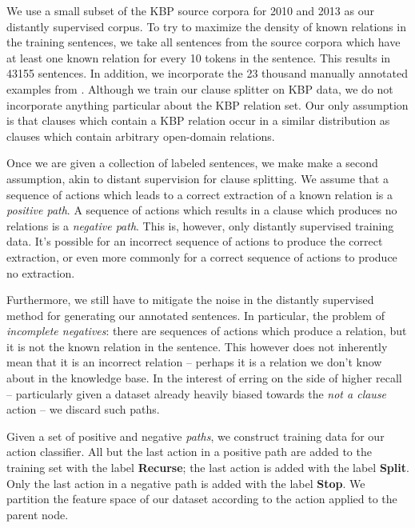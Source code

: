 We use a small subset of the KBP source corpora for 
  2010 \cite{key:2010ji-kbpoverview}
  and 2013 \cite{key:2013surdeanu-kbpoverview}
  as our distantly supervised corpus.
To try to maximize the density of known relations in the training sentences,
  we take all sentences from the source corpora which have at least one known
  relation for every 10 tokens in the sentence.
This results in \num{43155} sentences.
In addition, we incorporate the 23 thousand manually annotated examples
  from .
Although we train our clause splitter on KBP data, we do not incorporate
  anything particular about the KBP relation set.
Our only assumption is that clauses which contain a KBP relation occur in
  a similar distribution as clauses which contain arbitrary open-domain
  relations.

Once we are given a collection of labeled sentences, we make make a second
  assumption, akin to distant supervision for clause splitting.
We assume that a sequence of actions which leads to a correct extraction of
  a known relation is a \textit{positive path}.
A sequence of actions which results in a clause which produces no relations
  is a \textit{negative path}.
This is, however, only distantly supervised training data.
It's possible for an incorrect sequence of actions to produce the correct
  extraction, or even more commonly for a correct sequence of actions to 
  produce no extraction.

Furthermore, we still have to mitigate the noise in the distantly supervised
  method for generating our annotated sentences.
In particular, the problem of \textit{incomplete negatives}: there are sequences
  of actions which produce a relation, but it is not the known relation in the
  sentence.\needcite
This however does not inherently mean that it is an incorrect relation -- perhaps
  it is a relation we don't know about in the knowledge base.
In the interest of erring on the side of higher recall -- particularly given
  a dataset already heavily biased towards the \textit{not a clause} action --
  we discard such paths.

Given a set of positive and negative \textit{paths}, we construct training
  data for our action classifier.
All but the last action in a positive path are added to the training set
  with the label \textbf{Recurse}; the last action is added with the label
  \textbf{Split}.
Only the last action in a negative path is added with the label \textbf{Stop}.
We partition the feature space of our dataset according to the action
  applied to the parent node.

